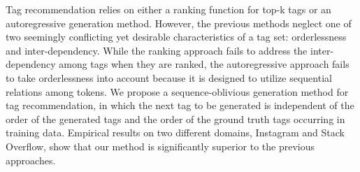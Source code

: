 Tag recommendation relies on either a ranking function for top-k tags or an autoregressive generation method. However, the previous methods neglect one of two seemingly conflicting yet desirable characteristics of a tag set: orderlessness and inter-dependency. While the ranking approach fails to address the inter-dependency among tags when they are ranked, the autoregressive approach fails to take orderlessness into account because it is designed to utilize sequential relations among tokens. We propose a sequence-oblivious generation method for tag recommendation, in which the next tag to be generated is independent of the order of the generated tags and the order of the ground truth tags occurring in training data. Empirical results on two different domains, Instagram and Stack Overflow, show that our method is significantly superior to the previous approaches.
